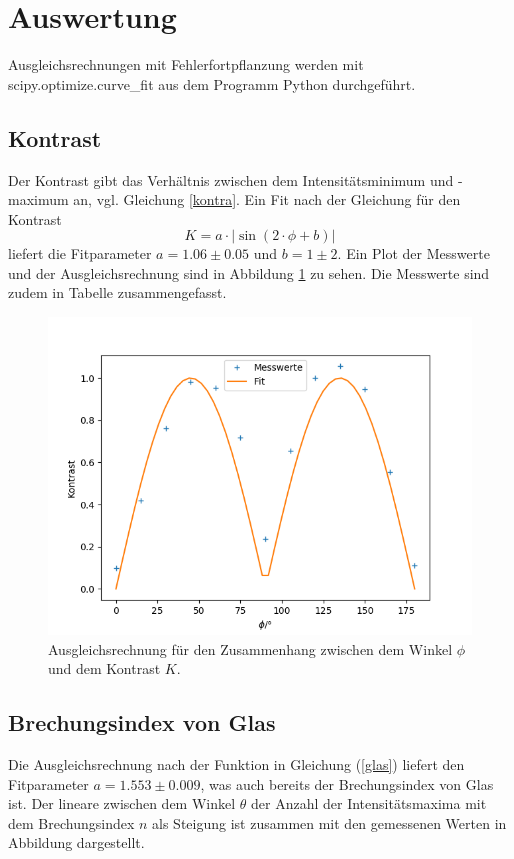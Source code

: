 \section{Auswertung}

Ausgleichsrechnungen mit Fehlerfortpflanzung werden mit scipy.optimize.curve\_fit aus dem Programm
Python durchgeführt.

\subsection{Kontrast}

Der Kontrast gibt das Verhältnis zwischen dem Intensitätsminimum und -maximum an, vgl. Gleichung
\ref{kontra}. Ein Fit nach der Gleichung für den Kontrast
\[
K = a \cdot | \sin (2 \cdot \phi + b) |
\]
liefert die Fitparameter $a = 1.06 \pm 0.05$ und $b = 1 \pm 2$. Ein Plot der Messwerte und der
Ausgleichsrechnung sind in Abbildung \ref{kontrast} zu sehen. Die Messwerte sind zudem in Tabelle
zusammengefasst.

\begin{figure}[h]
\centering
\includegraphics[width=\linewidth]{img/kontrast.png}
\caption{Ausgleichsrechnung für den Zusammenhang zwischen dem Winkel $\phi$ und dem Kontrast $K$.}
\label{kontrast}
\end{figure}

\subsection{Brechungsindex von Glas}

Die Ausgleichsrechnung nach der Funktion in Gleichung (\ref{glas})
liefert den Fitparameter $a = 1.553 \pm 0.009$, was auch bereits der Brechungsindex von Glas ist.
Der lineare zwischen dem Winkel $\theta$ der Anzahl der Intensitätsmaxima mit dem Brechungsindex $n$
als Steigung ist zusammen mit den gemessenen Werten in Abbildung dargestellt.

